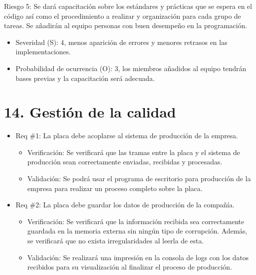 \documentclass[
11pt, %
]{charter}
\begin{document}
Riesgo 5: Se dará capacitación sobre los estándares y prácticas que se espera en el código así como el procedimiento a realizar y organización para cada grupo de tareas. Se añadirán al equipo personas con buen desempeño en la programación.
\begin{itemize}
	\item Severidad (S): 4, menos aparición de errores y menores retrasos en las implementaciones.   
	\item Probabilidad de ocurrencia (O): 3, los miembros añadidos al equipo tendrán bases previas y la capacitación será adecuada.
\end{itemize}

\section{14. Gestión de la calidad}
\label{sec:calidad}

\begin{itemize} 
\item Req \#1: La placa debe acoplarse al sistema de producción de la empresa.

\begin{itemize}
	\item Verificación: Se verificará que las tramas entre la placa y el sistema de producción sean correctamente enviadas, recibidas y procesadas.
	\item Validación: Se podrá usar el programa de escritorio para producción de la empresa para realizar un proceso completo sobre la placa.
\end{itemize}

\end{itemize}

\begin{itemize} 
\item Req \#2: La placa debe guardar los datos de producción de la compañía.

\begin{itemize}
	\item Verificación: Se verificará que la información recibida sea correctamente guardada en la memoria externa sin ningún tipo de corrupción. Además, se verificará que no exista irregularidades al leerla de esta.  
	\item Validación: Se realizará una impresión en la consola de logs con los datos recibidos para su visualización al finalizar el proceso de producción.
\end{itemize}

\end{itemize}
\end{document}
